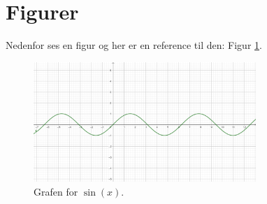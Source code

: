 
\section{Figurer}

Nedenfor ses en figur og her er en reference til den: Figur \ref{mylabel}.

\begin{figure}[h]
\centering
\includegraphics[width=0.75\textwidth]{billeder/sinx.png}
\caption{Grafen for $\sin(x)$.}\label{mylabel}
\end{figure}

